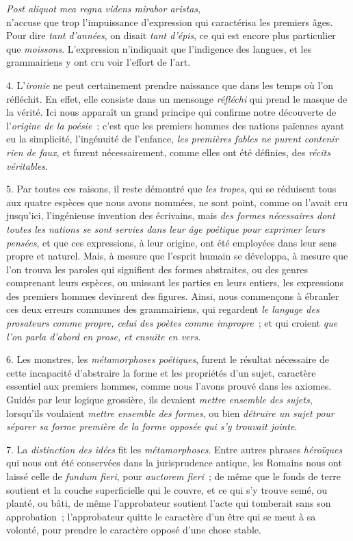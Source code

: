\documentclass[french,twoside]{book} %
\begin{document}
{\itshape Post aliquot mea regna videns mirabor aristas},\\

\noindent n’accuse que trop l’impuissance d’expression qui caractérisa les premiers âges. Pour dire {\itshape tant d’années}, on disait {\itshape tant d’épis}, ce qui est encore plus particulier que {\itshape moissons}. L’expression n’indiquait que l’indigence des langues, et les grammairiens y ont cru voir l’effort de l’art.\par
 4. L’{\itshape ironie} ne peut certainement prendre naissance que dans les temps où l’on réfléchit. En effet, elle consiste dans un mensonge {\itshape réfléchi} qui prend le masque de la vérité. Ici nous apparaît un grand principe qui confirme notre découverte de l’{\itshape origine de la poésie} ; c’est que les premiers hommes des nations païennes ayant eu la simplicité, l’ingénuité de l’enfance, {\itshape les premières fables ne purent contenir rien de faux}, et furent nécessairement, comme elles ont été définies, des {\itshape récits véritables}.\par
5. Par toutes ces raisons, il reste démontré que {\itshape les tropes}, qui se réduisent tous aux quatre espèces que nous avons nommées, ne sont point, comme on l’avait cru jusqu’ici, l’ingénieuse invention des écrivains, mais {\itshape des formes nécessaires dont toutes les nations se sont servies dans leur âge poétique pour exprimer leurs pensées}, et que ces expressions, à leur origine, ont été employées dans leur sens propre et naturel. Mais, à mesure que l’esprit humain se développa, à mesure que l’on trouva les paroles qui signifient des formes abstraites, ou des genres comprenant leurs espèces, ou unissant les parties en leurs entiers, les expressions des premiers hommes devinrent des figures. Ainsi, nous commençons à ébranler ces deux erreurs communes des grammairiens, qui regardent {\itshape le langage des prosateurs comme propre, celui des poètes comme impropre} ; et qui croient {\itshape que l’on parla d’abord en prose, et ensuite en vers}.\par
6. Les monstres, les {\itshape métamorphoses poétiques},  furent le résultat nécessaire de cette incapacité d’abstraire la forme et les propriétés d’un sujet, caractère essentiel aux premiers hommes, comme nous l’avons prouvé dans les axiomes. Guidés par leur logique grossière, ils devaient {\itshape mettre ensemble des sujets}, lorsqu’ils voulaient {\itshape mettre ensemble des formes}, ou bien {\itshape détruire un sujet pour séparer sa forme première de la forme opposée qui s’y trouvait jointe}.\par
7. La {\itshape distinction des idées} fit les {\itshape métamorphoses}. Entre autres phrases {\itshape héroïques} qui nous ont été conservées dans la jurisprudence antique, les Romains nous ont laissé celle de {\itshape fundum fieri}, pour {\itshape auctorem fieri} ; de même que le fonds de terre soutient et la couche superficielle qui le couvre, et ce qui s’y trouve semé, ou planté, ou bâti, de même l’approbateur soutient l’acte qui tomberait sans son approbation ; l’approbateur quitte le caractère d’un être qui se meut à sa volonté, pour prendre le caractère opposé d’une chose stable.
\end{document}
